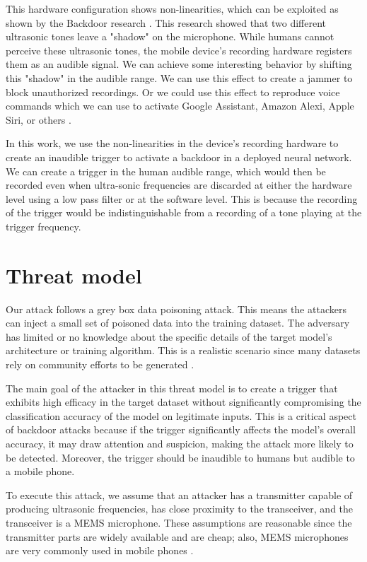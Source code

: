 \documentclass{report}
\theoremstyle{definition}
\theoremstyle{remark}
\begin{document}
This hardware configuration shows non-linearities, which can be exploited as shown by the Backdoor research \cite{BACKDOORMEMS}. This research showed that two different ultrasonic tones leave a "shadow" on the microphone. While humans cannot perceive these ultrasonic tones, the mobile device's recording hardware registers them as an audible signal. We can achieve some interesting behavior by shifting this "shadow" in the audible range. We can use this effect to create a jammer \cite{JAMMER} to block unauthorized recordings. Or we could use this effect to reproduce voice commands which we can use to activate Google Assistant,  Amazon Alexi, Apple Siri, or others \cite{POSTER} \cite{DOLPHIN}.

In this work, we use the non-linearities in the device's recording hardware to create an inaudible trigger to activate a backdoor in a deployed neural network. We can create a trigger in the human audible range, which would then be recorded even when ultra-sonic frequencies are discarded at either the hardware level using a low pass filter or at the software level. This is because the recording of the trigger would be indistinguishable from a recording of a tone playing at the trigger frequency.
 
\section{Threat model}
Our attack follows a grey box data poisoning attack. This means the attackers can inject a small set of poisoned data into the training dataset. The adversary has limited or no knowledge about the specific details of the target model's architecture or training algorithm. This is a realistic scenario since many datasets rely on community efforts to be generated \cite{Speech_commands} \cite{CommonVoice}.

The main goal of the attacker in this threat model is to create a trigger that exhibits high efficacy in the target dataset without significantly compromising the classification accuracy of the model on legitimate inputs. This is a critical aspect of backdoor attacks because if the trigger significantly affects the model's overall accuracy, it may draw attention and suspicion, making the attack more likely to be detected. Moreover, the trigger should be inaudible to humans but audible to a mobile phone.

To execute this attack, we assume that an attacker has a transmitter capable of producing ultrasonic frequencies, has close proximity to the transceiver, and the transceiver is a MEMS microphone. These assumptions are reasonable since the transmitter parts are widely available and are cheap; also, MEMS microphones are very commonly used in mobile phones \cite{7180939}. 
\end{document}
